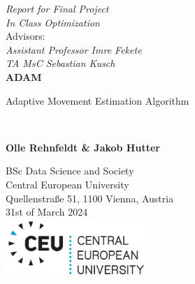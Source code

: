 \documentclass[oneside]{article}
\begin{document}
\begin{titlepage}
   \begin{center}
        \vfill
        \textit{Report for Final Project}\\
        \textit{In Class Optimization}\\
        \vspace{0.5cm}
        Advisors:\\
        \textit{Assistant Professor Imre Fekete}\\
        \textit{TA MsC Sebastian Kusch}
        \vfill\noindent\hrulefill \\
        \vspace*{1cm}
        \textbf{\huge ADAM}\\
        \vspace{0.5cm}
        
         Adaptive Movement Estimation Algorithm
        
        \noindent\hrulefill \\

       
            
       \vspace{1.5cm}

       \textbf{Olle Rehnfeldt \& Jakob Hutter}

       \vfill
            
       
            
       \vspace{2cm}
       BSc Data Science and Society\\
       Central European University\\
       Quellenstraße 51, 1100 Vienna, Austria\\
       31st of March 2024\\
       \vspace{1.5cm}
       \includegraphics[width=0.4\textwidth]{figures/CEU_Logo_RGB_DualColor.png}
       
            
   \end{center}
\end{titlepage}

\pagestyle{fancy}
\newpage
\end{document}
